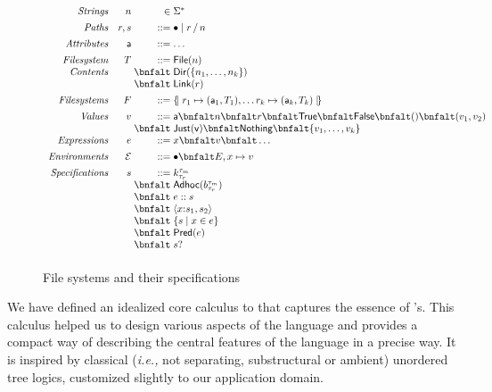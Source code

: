 \begin{figure}
\[
\begin{array}{rr@{\;}r@{\;}l}
\textit{Strings}        & n & \in & \Sigma^{\ast} \\[1ex]
\textit{Paths}          & r,s & \bnfdef & \PNil \mid \PCons{r}{n} \\[1ex]
\textit{Attributes}     & \att  & \bnfdef & \dots\\[1ex]
\textit{Filesystem}     & T  & \bnfdef & \File{n} \\
\textit{Contents}       &    & \bnfalt & \Dir{ \Set{n_1,\dots,n_k} }\\
                        &    & \bnfalt & \Link{r}\\[1ex]
\textit{Filesystems}    & F & \bnfdef & \Map{ r_1 \mapsto (\att_1,T_1), \dots r_k \mapsto (\att_k,T_k) }\\[1ex]
\textit{Values}         & v & \bnfdef & \att \bnfalt n \bnfalt r \bnfalt \True \bnfalt \False \bnfalt () \bnfalt (v_1,v_2) \\
                        &   & \bnfalt & \Just{v} \bnfalt \Nothing \bnfalt \{ v_1,\dots,v_k \}\\
\textit{Expressions}    & e & \bnfdef & x \bnfalt v \bnfalt \dots \\[1ex]
\textit{Environments}   & \Env & \bnfdef & \ENil \bnfalt E,x\mapsto v \\[1ex]
\textit{Specifications} & s & \bnfdef & \Sk \\
                        &   & \bnfalt & \SAdhoc{b}\\
                        &   & \bnfalt & \SPath{e}{s}\\
                        &   & \bnfalt & \SPair{x}{s_1}{s_2}\\
                        &   & \bnfalt & \SSetComp{s}{x}{e}\\
                        &   & \bnfalt & \SPred{e}\\
                        &   & \bnfalt & \SOption{s}\\[1ex]
\end{array}
\]
\caption{File systems and their specifications}
\label{fig:calculus-syntax}
\end{figure}

We have defined an idealized core calculus to that captures the
essence of \forest{}'s.  This calculus helped us to design various
aspects of the language and provides a compact way of describing the
central features of the language in a precise way.  It is inspired by
classical ({\em i.e.,} not separating, substructural or ambient)
unordered tree logics, customized slightly to our application domain.


